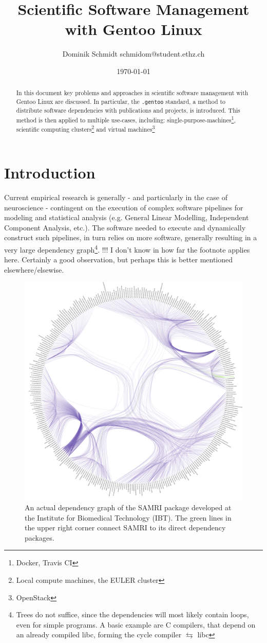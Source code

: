 \documentclass[11pt]{scrartcl}
\author{Dominik Schmidt \textsf{schmidom@student.ethz.ch}}
\title{Scientific Software Management with Gentoo Linux}
\date{\today}
\newcommand{\dg}[1]{\texttt{#1}}
\begin{document}
	\maketitle
	\begin{abstract}
		In this document key problems and approaches in scientific
		software management with Gentoo Linux are discussed.
		In particular, the \dg{.gentoo} standard, a method to distribute software dependencies with publications and projects, is introduced.
		This method is then applied to multiple use-cases, including:
		single-purpose-machines\footnote{Docker, Travis CI},
		scientific computing clusters\footnote{Local compute machines, the EULER cluster}
		and virtual machines\footnote{OpenStack}
	\end{abstract}
	\section{Introduction}
		Current empirical research is generally - and particularly in the case of neuroscience - contingent on the execution of complex software pipelines for modeling and statistical analysis (e.g. General Linear Modelling, Independent Component Analysis, etc.).
		The software needed to execute and dynamically construct such pipelines, in turn relies on more software, generally resulting in a very large dependency graph\footnote{Trees do not suffice, since the dependencies will most likely contain loops, even for simple programs. A basic example are C compilers, that depend on an already compiled libc, forming the cycle compiler $\leftrightarrows$ libc}.
		!!! I don't know in how far the footnote applies here. Certainly a good observation, but perhaps this is better mentioned elsewhere/elsewise.

		\begin{figure}[H]
			\centering
			\includegraphics[width=0.75\linewidth]{graph/Real_Dependencygraph/RealDepgraph2.png}
			\caption{An actual dependency graph of the SAMRI package developed at the Institute for Biomedical Technology (IBT). The green lines in the upper right corner connect SAMRI to its direct dependency packages.}
		\end{figure}
		
\end{document}
